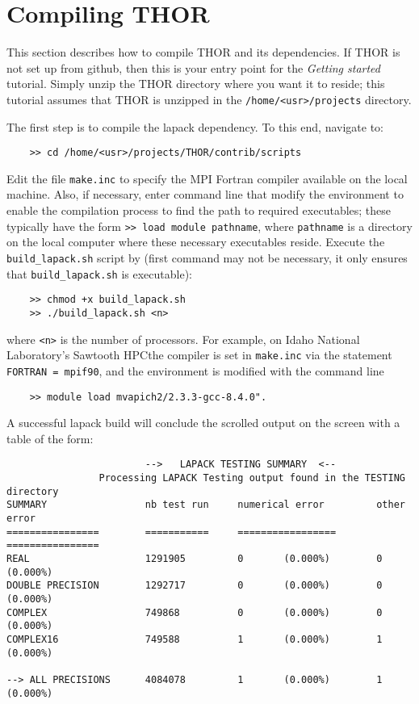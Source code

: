 \section{Compiling THOR}
This section describes how to compile THOR and its dependencies. If THOR is not set up from github, then this is your entry point for the \textit{Getting started} tutorial. Simply unzip the THOR directory where you want it to reside; this tutorial assumes that THOR is unzipped in the \verb"/home/<usr>/projects" directory.

The first step is to compile the lapack dependency. To this end, navigate to:
\begin{verbatim}
    >> cd /home/<usr>/projects/THOR/contrib/scripts
\end{verbatim}
Edit the file \verb"make.inc" to specify the MPI Fortran compiler available on the local machine. Also, if necessary, enter command line that modify the environment to enable the compilation process to find the path to required executables; these typically have the form \verb">> load module pathname", where \verb"pathname" is a directory on the local computer where these necessary executables reside.
Execute the \verb"build_lapack.sh" script by (first command may not be necessary, it only ensures that \verb"build_lapack.sh" is executable):
\begin{verbatim}
    >> chmod +x build_lapack.sh
    >> ./build_lapack.sh <n>
\end{verbatim}
where \verb"<n>" is the number of processors. 
For example, on Idaho National Laboratory's Sawtooth HPCthe compiler is set in \verb"make.inc" via the statement \verb"FORTRAN = mpif90", and the environment is  modified with the command line
\begin{verbatim}
    >> module load mvapich2/2.3.3-gcc-8.4.0".
\end{verbatim}
A successful lapack build will conclude the scrolled output on the screen with a table of the form:
\begin{verbatim}
                        -->   LAPACK TESTING SUMMARY  <--
                Processing LAPACK Testing output found in the TESTING directory
SUMMARY                 nb test run     numerical error         other error
================        ===========     =================       ================
REAL                    1291905         0       (0.000%)        0       (0.000%)
DOUBLE PRECISION        1292717         0       (0.000%)        0       (0.000%)
COMPLEX                 749868          0       (0.000%)        0       (0.000%)
COMPLEX16               749588          1       (0.000%)        1       (0.000%)

--> ALL PRECISIONS      4084078         1       (0.000%)        1       (0.000%)
\end{verbatim}
